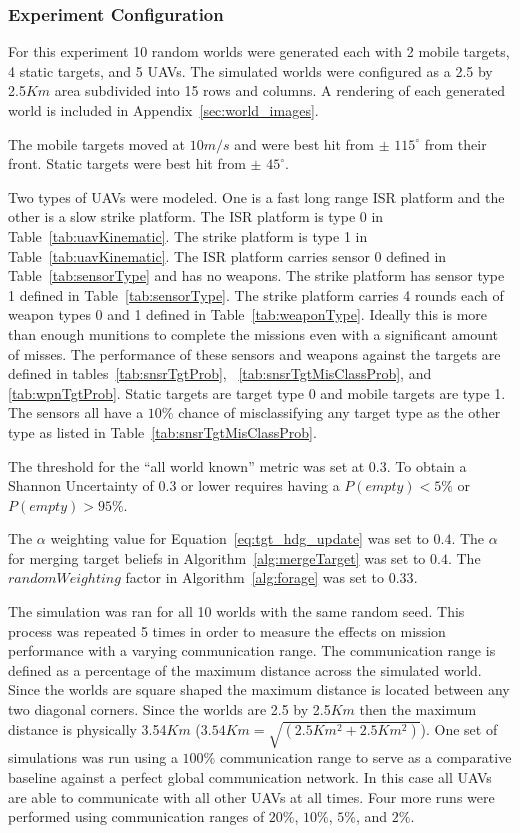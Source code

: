 \subsubsection{Experiment Configuration}
For this experiment 10 random worlds were generated each with 2 mobile targets, 4 static targets, and 5 UAVs.  The simulated worlds were configured as a 2.5 by 2.5$Km$ area subdivided into 15 rows and columns.  A rendering of each generated world is included in Appendix~\ref{sec:world_images}.

The mobile targets moved at $10m/s$ and were best hit from $\pm$ $115^{\circ}$ from their front.  Static targets were best hit from $\pm$ $45^{\circ}$.

Two types of UAVs were modeled.  One is a fast long range ISR platform and the other is a slow strike platform.  The ISR platform is type 0 in Table~\ref{tab:uavKinematic}.  The strike platform is type 1 in Table~\ref{tab:uavKinematic}.  The ISR platform carries sensor 0 defined in Table~\ref{tab:sensorType} and has no weapons.  The strike platform has sensor type 1 defined in Table~\ref{tab:sensorType}.  The strike platform carries 4 rounds each of weapon types 0 and 1 defined in Table~\ref{tab:weaponType}.  Ideally this is more than enough munitions to complete the missions even with a significant amount of misses.  The performance of these sensors and weapons against the targets are defined in tables~\ref{tab:snsrTgtProb}, ~\ref{tab:snsrTgtMisClassProb}, and \ref{tab:wpnTgtProb}.  Static targets are target type 0 and mobile targets are type 1.  The sensors all have a $10\%$ chance of misclassifying any target type as the other type as listed in Table~\ref{tab:snsrTgtMisClassProb}.

The threshold for the ``all world known'' metric was set at 0.3. To obtain a Shannon Uncertainty of 0.3 or lower requires having a $P(empty) < 5\%$ or $P(empty) > 95\%$.

The $\alpha$ weighting value for Equation~\ref{eq:tgt_hdg_update} was set to $0.4$.  The $\alpha$ for merging target beliefs in Algorithm~\ref{alg:mergeTarget} was set to $0.4$.  The $randomWeighting$ factor in Algorithm~\ref{alg:forage} was set to $0.33$.

The simulation was ran for all 10 worlds with the same random seed.  This process was repeated 5 times in order to measure the effects on mission performance with a varying communication range.  The communication range is defined as a percentage of the maximum distance across the simulated world.  Since the worlds are square shaped the maximum distance is located between any two diagonal corners.  Since the worlds are 2.5 by 2.5$Km$ then the maximum distance is physically 3.54$Km$ ($3.54Km = \sqrt{(2.5Km^{2}+2.5Km^{2})}$).  One set of simulations was run using a $100\%$ communication range to serve as a comparative baseline against a perfect global communication network.  In this case all UAVs are able to communicate with all other UAVs at all times. Four more runs were performed using communication ranges of $20\%$, $10\%$, $5\%$, and $2\%$.
